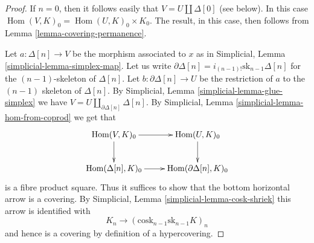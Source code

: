 \documentclass[10pt,a4paper]{amsart}
\theoremstyle{plain}
\theoremstyle{definition}
\theoremstyle{remark}
\numberwithin{equation}{subsection}
\def\Hom{\mathop{\mathrm{Hom}}\nolimits}
\begin{document}
\begin{proof}
If $n = 0$, then it follows easily that $V = U \amalg \Delta[0]$
(see below). In this case $\Hom(V, K)_0 =
\Hom(U, K)_0 \times K_0$. The result, in this case, then follows
from Lemma \ref{lemma-covering-permanence}.

\medskip\noindent
Let $a : \Delta[n] \to V$ be the morphism associated to $x$
as in Simplicial, Lemma \ref{simplicial-lemma-simplex-map}.
Let us write $\partial \Delta[n] = i_{(n-1)!} \text{sk}_{n - 1} \Delta[n]$
for the $(n - 1)$-skeleton of $\Delta[n]$.
Let $b : \partial \Delta[n] \to U$ be the restriction
of $a$ to the $(n - 1)$ skeleton of $\Delta[n]$. By
Simplicial, Lemma \ref{simplicial-lemma-glue-simplex}
we have $V = U \amalg_{\partial \Delta[n]} \Delta[n]$. By
Simplicial, Lemma
\ref{simplicial-lemma-hom-from-coprod}
we get that
$$
\xymatrix{
\Hom(V, K)_0 \ar[r] \ar[d] &
\Hom(U, K)_0 \ar[d] \\
\Hom(\Delta[n], K)_0 \ar[r] &
\Hom(\partial \Delta[n], K)_0
}
$$
is a fibre product square. Thus it suffices to show that
the bottom horizontal arrow is a covering. By
Simplicial, Lemma \ref{simplicial-lemma-cosk-shriek}
this arrow is identified with
$$
K_n \to (\text{cosk}_{n - 1} \text{sk}_{n - 1} K)_n
$$
and hence is a covering by definition of a hypercovering.
\end{proof}
\end{document}
